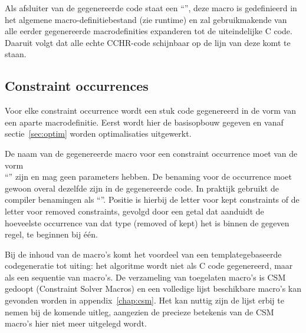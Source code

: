 {Als afsluiter van de gegenereerde code staat een ``'', deze macro is gedefinieerd in het algemene macro-definitiebestand (zie runtime) en zal gebruikmakende van alle eerder gegenereerde macrodefinities expanderen tot de uiteindelijke C code. Daaruit volgt dat alle echte CCHR-code schijnbaar op de lijn van deze  komt te staan.

\subsection{Constraint occurrences} \label{gencode-conocc}

Voor elke constraint occurrence wordt een stuk code gegenereerd in de vorm van een aparte macrodefinitie. Eerst wordt hier de basisopbouw gegeven en vanaf sectie~\ref{sec:optim} worden optimalisaties uitgewerkt.

De naam van de gegenereerde macro voor een constraint occurrence moet van de vorm \\ ``'' zijn en mag geen parameters hebben. De benaming voor de occurrence moet gewoon overal dezelfde zijn in de gegenereerde code. In praktijk gebruikt de compiler benamingen als  ``''. Positie is hierbij de letter  voor kept constraints of de letter  voor removed constraints, gevolgd door een getal dat aanduidt de hoeveelste occurrence van dat type (removed of kept) het is binnen de gegeven regel, te beginnen bij \'e\'en.

Bij de inhoud van de macro's komt het voordeel van een templategebaseerde codegeneratie tot uiting: het algoritme wordt niet als C code gegenereerd, maar als een sequentie van macro's. De verzameling van toegelaten macro's is CSM gedoopt (Constraint Solver Macros) en een volledige lijst beschikbare macro's kan gevonden worden in appendix~\ref{chap:csm}. Het kan nuttig zijn de lijst erbij te nemen bij de komende uitleg, aangezien de precieze betekenis van de CSM macro's hier niet meer uitgelegd wordt.

}
